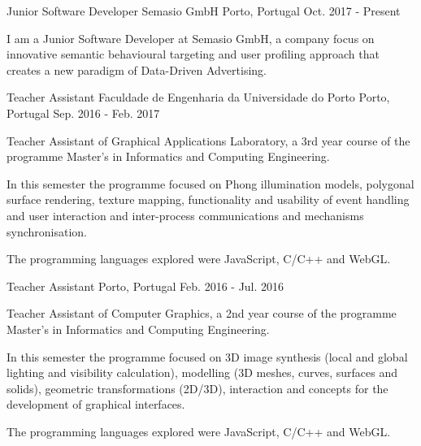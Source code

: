 \begin{cventries}
    \cventry
    {Junior Software Developer} %
    {Semasio GmbH} %
    {Porto, Portugal} %
    {Oct. 2017 - Present} %
    {
      \begin{cvitems} %
      \item {
        I am a Junior Software Developer at Semasio GmbH, a company focus on innovative semantic behavioural targeting and user profiling approach that creates a new paradigm of Data-Driven Advertising.
      }
      \end{cvitems}
    }


   \cventry
    {Teacher Assistant} %
    {Faculdade de Engenharia da Universidade do Porto} %
    {Porto, Portugal} %
    {Sep. 2016 - Feb. 2017} %
    {
      \begin{cvitems} %
        \item {Teacher Assistant of Graphical Applications Laboratory, a 3rd year course of the programme Master's in Informatics and Computing Engineering.}
        \item{In this semester the programme focused on Phong illumination models, polygonal surface rendering, texture mapping, functionality and usability of event handling and user interaction and inter-process communications and mechanisms synchronisation.}
        \item{The programming languages explored were JavaScript, C/C++ and WebGL.}
      \end{cvitems}
    }

  \cventry
    {Teacher Assistant} %
    {} %
    {Porto, Portugal} %
    {Feb. 2016 - Jul. 2016} %
    {
      \begin{cvitems} %
        \item{Teacher Assistant of Computer Graphics, a 2nd year course of the programme Master's in Informatics and Computing Engineering.}
        \item{In this semester the programme focused on 3D image synthesis (local and global lighting and visibility calculation), modelling (3D meshes, curves, surfaces and solids), geometric transformations (2D/3D), interaction and concepts for the development of graphical interfaces.}
        \item{The programming languages explored were JavaScript, C/C++ and WebGL.}
      \end{cvitems}
    }
\end{cventries}
